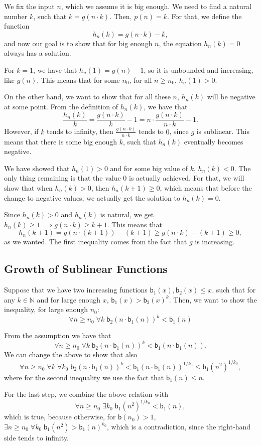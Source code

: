 \documentclass[11pt]{article}
\newcommand{\N}{\mathbb{N}}
\newcommand{\bd}{\mathsf{b}}
\theoremstyle{definition}
\theoremstyle{definition}
\theoremstyle{remark}
\begin{document}
We fix the input $n$, which we assume it is big enough. We need to find a natural number $k$, such that $k = g(n \cdot k)$. Then, $p(n)=k$. For that, we define the function
$$
h_n(k)=g(n\cdot k)-k,
$$
and now our goal is to show that for big enough $n$, the equation $h_n(k)=0$ always has a solution.

For $k=1$, we have that $h_n(1)=g(n)-1$, so it is unbounded and increasing, like $g(n)$. This means that for some $n_0$, for all $n\geq n_0$, $h_n(1)>0$.

On the other hand, we want to show that for all these $n$, $h_n(k)$ will be negative at some point. From the definition of $h_n(k)$, we have that
$$
\frac{h_n(k)}{k} = \frac{g(n\cdot k)}{k}-1 = n\cdot \frac{g(n\cdot k)}{n\cdot k}-1.
$$
However, if $k$ tends to infinity, then $\frac{g(n\cdot k)}{n\cdot k}$ tends to $0$, since $g$ is sublinear. This means that there is some big enough $k$, such that $h_n(k)$ eventually becomes negative.

We have showed that $h_n(1)>0$ and for some big value of $k$, $h_n(k)<0$. The only thing remaining is that the value $0$ is actually achieved. For that, we will show that when $h_n(k)>0$, then $h_n(k+1)\geq 0$, which means that before the change to negative values, we actually get the solution to $h_n(k)=0$.

Since $h_n(k)>0$ and $h_n(k)$ is natural, we get $h_n(k)\geq 1\implies g(n\cdot k)\geq k+1$. This means that
$$
h_n(k+1)= g(n\cdot (k+1))-(k+1) \geq g(n\cdot k)-(k+1)\geq 0,
$$
as we wanted. The first inequality comes from the fact that $g$ is increasing.

\subsection{Growth of Sublinear Functions}\label{sec:growth}

Suppose that we have two increasing functions $\bd_1(x), \bd_2(x) \leq x$, such that for any $k\in\N$ and for large enough $x$, $\bd_1(x)> \bd_2(x)^k$. Then, we want to show the inequality, for large enough $n_0$:
\begin{equation}
\forall n\geq n_0 \;\forall k \;\bd_2(n\cdot\bd_1(n))^k< \bd_1(n)
\nonumber
\end{equation}

From the assumption we have that 
$$
\forall n\geq n_0 \;\forall k \;\bd_2(n\cdot\bd_1(n))^k< \bd_1(n\cdot\bd_1(n)).
$$
We can change the above to show that also
$$
\forall n\geq n_0 \;\forall k \;\forall k_0\;\bd_2(n\cdot\bd_1(n))^k< \bd_1(n\cdot\bd_1(n))^{1/k_0}\leq \bd_1(n^2)^{1/k_0},
$$
where for the second inequality we use the fact that $\bd_1(n)\leq n$.

For the last step, we combine the above relation with
$$
\forall n\geq n_0  \;\exists k_0\; \bd_1(n^2)^{1/k_0}< \bd_1(n),
$$
which is true, because otherwise, for $\bd(n_0)>1$, $\exists n\geq n_0\;\forall k_0\; \bd_1(n^2)>\bd_1(n)^{k_0}$, which is a contradiction, since the right-hand side tends to infinity.
\end{document}
